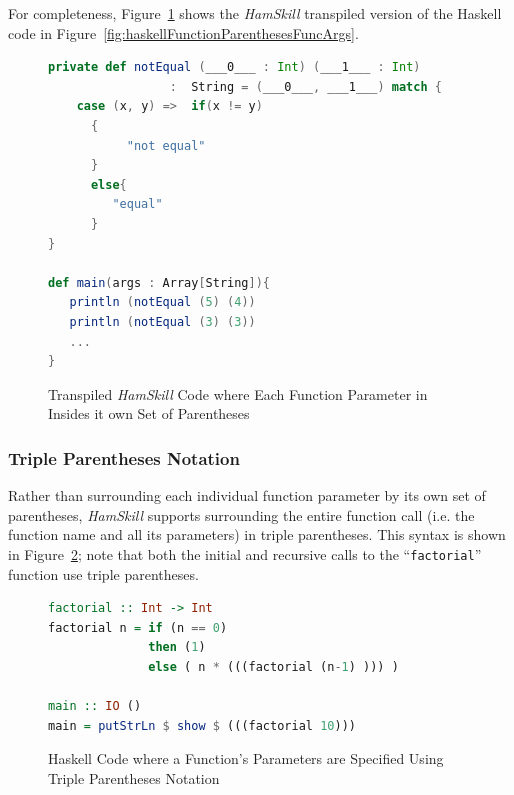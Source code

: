 \documentclass{report}
\begin{document}
For completeness, Figure~\ref{fig:scalaFunctionParenthesesFuncArgs} shows the \textit{HamSkill} transpiled version of the Haskell code in Figure~\ref{fig:haskellFunctionParenthesesFuncArgs}.

\begin{figure}[H]
\begin{mdframed}
\begin{lstlisting}[language=Scala, showstringspaces=false]
private def notEqual (___0___ : Int) (___1___ : Int) 
                 :  String = (___0___, ___1___) match {
    case (x, y) =>  if(x != y)
      {
           "not equal"
      }
      else{
         "equal"
      }
} 
  
def main(args : Array[String]){
   println (notEqual (5) (4))
   println (notEqual (3) (3))
   ...
}
\end{lstlisting}
\end{mdframed}
\caption{Transpiled \textit{HamSkill} Code where Each Function Parameter in Insides it own Set of Parentheses}\label{fig:scalaFunctionParenthesesFuncArgs}
\end{figure}

\subsubsection{Triple Parentheses Notation}

Rather than surrounding each individual function parameter by its own set of parentheses, \textit{HamSkill} supports surrounding the entire function call (i.e. the function name and all its parameters) in triple parentheses.  This syntax is shown in Figure~\ref{fig:haskellFunctionFactorial}; note that both the initial and recursive calls to the ``\texttt{factorial}'' function use triple parentheses.

\begin{figure}[H]
\begin{mdframed}
\begin{lstlisting}[language=Haskell]
factorial :: Int -> Int
factorial n = if (n == 0)
              then (1)
              else ( n * (((factorial (n-1) ))) )

main :: IO ()
main = putStrLn $ show $ (((factorial 10)))
\end{lstlisting}
\end{mdframed}
\caption{Haskell Code where a Function's Parameters are Specified Using Triple Parentheses Notation}\label{fig:haskellFunctionFactorial}
\end{figure}
\end{document}
